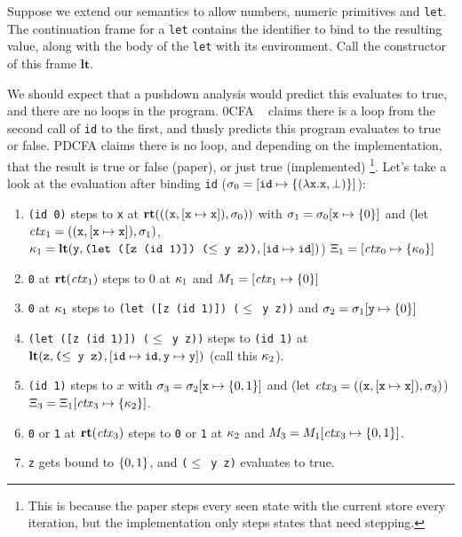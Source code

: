 Suppose we extend our semantics to allow numbers, numeric primitives and \texttt{let}.
%
The continuation frame for a \texttt{let} contains the identifier to bind to the resulting value, along with the body of the \texttt{let} with its environment.
%
Call the constructor of this frame $\mathbf{lt}$.

We should expect that a pushdown analysis would predict this evaluates to true, and there are no loops in the program.
%
0CFA ~\citep{ianjohnson:Shivers:1991:CFA} claims there is a loop from the second call of \texttt{id} to the first, and thusly predicts this program evaluates to true or false.
%
PDCFA claims there is no loop, and depending on the implementation, that the result is true or false (paper), or just true (implemented)
\footnote{This is because the paper steps every seen state with the current store every iteration, but the implementation only steps states that need stepping.}.
%
Let's take a look at the evaluation after binding \texttt{id} ($\sigma_0 = [\texttt{id} \mapsto \{ (\lambda{} \texttt{x}. \texttt{x}, \bot) \}]$):

\begin{enumerate}
\item{\texttt{(id 0)} steps to \texttt{x} at $\mathbf{rt}(((\texttt{x}, [\texttt{x}\mapsto\texttt{x}]), \sigma_0))$ with $\sigma_1 =
    \sigma_0[\texttt{x} \mapsto \{ 0 \}]$ and
    (let $\mathit{ctx}_1 = ((\texttt{x},[\texttt{x}\mapsto\texttt{x}]),\sigma_1)$,
         $\kappa_1 = \mathbf{lt}(\texttt{y}, \texttt{(let ([z (id 1)]) ($\le$ y z))}, [\texttt{id}\mapsto{\texttt{id}}])$)
    $\Xi_1 = [\mathit{ctx}_0 \mapsto \{ \kappa_0 \}]$}
\item{\texttt{0} at $\mathbf{rt}(\mathit{ctx}_1)$ steps to $0$ at $\kappa_1$ and $M_1 = [\mathit{ctx}_1 \mapsto \{ 0 \}]$}
\item{\texttt{0} at $\kappa_1$ steps to \texttt{(let ([z (id 1)]) ($\le$ y z))} and $\sigma_2 = \sigma_1[\texttt{y} \mapsto \{ 0 \}]$}
\item{\texttt{(let ([z (id 1)]) ($\le$ y z))} steps to \texttt{(id 1)} at \\
      $\mathbf{lt}(\texttt{z}, \texttt{($\le$ y z)}, [\texttt{id} \mapsto \texttt{id}, \texttt{y} \mapsto \texttt{y}])$
      (call this $\kappa_2$).}
\item{\texttt{(id 1)} steps to $x$ with $\sigma_3 = \sigma_2[\texttt{x} \mapsto \{ 0,1 \}]$ and
      (let $\mathit{ctx}_3 = ((\texttt{x},[\texttt{x}\mapsto\texttt{x}]),\sigma_3)$) $\Xi_3 =\Xi_1[\mathit{ctx}_3 \mapsto \{ \kappa_2 \}]$.}
\item{\texttt{0} or \texttt{1} at $\mathbf{rt}(\mathit{ctx}_3)$ steps to \texttt{0} or \texttt{1} at $\kappa_2$ and $M_3 = M_1[\mathit{ctx}_3 \mapsto \{ 0,1 \}]$.}
\item{\texttt{z} gets bound to $\{ 0,1 \}$, and \texttt{($\le$ y z)} evaluates to true.}
\end{enumerate}

